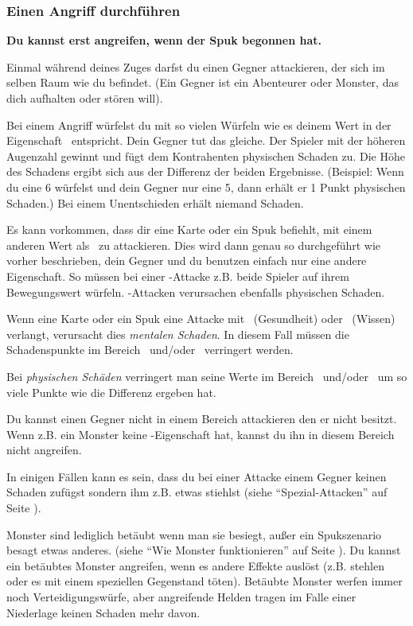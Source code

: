 \subsubsection{Einen Angriff durchführen}
\label{kap:rule:attack}

\textbf{Du kannst erst angreifen, wenn der Spuk begonnen hat.}

Einmal während deines Zuges darfst du einen Gegner attackieren, der sich im selben Raum wie du befindet.  (Ein Gegner ist ein Abenteurer oder Monster, das dich aufhalten oder stören will).

Bei einem Angriff würfelst du mit so vielen Würfeln wie es deinem Wert in der Eigenschaft \might\ entspricht. Dein Gegner tut das gleiche. Der Spieler mit der höheren Augenzahl gewinnt und fügt dem Kontrahenten physischen Schaden zu. Die Höhe des Schadens ergibt sich aus der Differenz der beiden Ergebnisse. (Beispiel: Wenn du eine 6 würfelst und dein Gegner nur eine 5, dann erhält er 1 Punkt physischen Schaden.) Bei einem Unentschieden
erhält niemand Schaden.

Es kann vorkommen, dass dir eine Karte oder ein Spuk befiehlt, mit einem anderen Wert als \might\ zu attackieren. Dies wird dann genau so durchgeführt wie vorher beschrieben, dein Gegner und du benutzen einfach nur eine andere Eigenschaft. So müssen bei einer \speed -Attacke z.B. beide Spieler auf ihrem Bewegungswert würfeln. \speed -Attacken verursachen ebenfalls physischen Schaden.

Wenn eine Karte oder ein Spuk eine Attacke mit \sanity\ (Gesundheit) oder \know\ (Wissen) verlangt, verursacht dies \emph{mentalen Schaden}. In diesem Fall müssen die Schadenspunkte im Bereich \sanity\ und/oder \know\ verringert werden.

Bei \emph{physischen Schäden} verringert man seine Werte im Bereich \might\ und/oder \speed\ um so viele Punkte wie die Differenz ergeben hat.

Du kannst einen Gegner nicht in einem Bereich attackieren den er nicht besitzt. Wenn z.B. ein Monster keine \sanity-Eigenschaft hat, kannst du ihn in diesem Bereich nicht angreifen.

In einigen Fällen kann es sein, dass du bei einer Attacke einem Gegner keinen Schaden zufügst sondern ihm z.B. etwas stiehlst (siehe ``Spezial-Attacken'' auf Seite \pageref{kap:rule:specialattack}).

Monster sind lediglich betäubt wenn man sie besiegt, außer ein Spukszenario besagt etwas anderes. (siehe ``Wie Monster funktionieren'' auf Seite \pageref{kap:rules:monsters}). Du kannst ein betäubtes Monster angreifen, wenn es andere Effekte auslöst (z.B. stehlen oder es mit einem speziellen Gegenstand töten). Betäubte Monster werfen immer noch Verteidigungswürfe, aber angreifende Helden tragen im Falle einer Niederlage keinen Schaden mehr davon.

